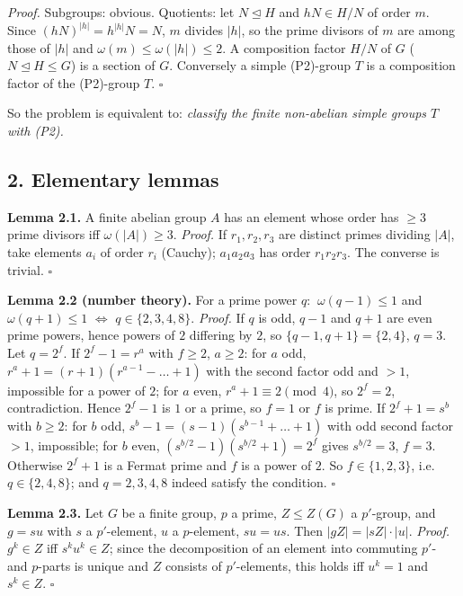 \documentclass[11pt,a4paper]{article}
\begin{document}
\emph{Proof.} Subgroups: obvious. Quotients: let \(N\trianglelefteq H\)
and \(hN\in H/N\) of order \(m\). Since \((hN)^{|h|}=h^{|h|}N=N\), \(m\)
divides \(|h|\), so the prime divisors of \(m\) are among those of
\(|h|\) and \(\omega(m)\le\omega(|h|)\le 2\). A composition factor
\(H/N\) of \(G\) (\(N\trianglelefteq H\le G\)) is a section of \(G\).
Conversely a simple (P2)-group \(T\) is a composition factor of the
(P2)-group \(T\). \(\square\)

So the problem is equivalent to: \emph{classify the finite non-abelian
simple groups \(T\) with (P2).}

\subsection{2. Elementary lemmas}\label{elementary-lemmas}

\textbf{Lemma 2.1.} A finite abelian group \(A\) has an element whose
order has \(\ge 3\) prime divisors iff \(\omega(|A|)\ge 3\).
\emph{Proof.} If \(r_1,r_2,r_3\) are distinct primes dividing \(|A|\),
take elements \(a_i\) of order \(r_i\) (Cauchy); \(a_1a_2a_3\) has order
\(r_1r_2r_3\). The converse is trivial. \(\square\)

\textbf{Lemma 2.2 (number theory).} For a prime power \(q\):
\(\ \omega(q-1)\le 1\) and \(\omega(q+1)\le 1\) \(\iff\)
\(q\in\{2,3,4,8\}\). \emph{Proof.} If \(q\) is odd, \(q-1\) and \(q+1\)
are even prime powers, hence powers of \(2\) differing by \(2\), so
\(\{q-1,q+1\}=\{2,4\}\), \(q=3\). Let \(q=2^f\). If \(2^f-1=r^a\) with
\(f\ge 2\), \(a\ge 2\): for \(a\) odd, \(r^a+1=(r+1)(r^{a-1}-\dots+1)\)
with the second factor odd and \(>1\), impossible for a power of \(2\);
for \(a\) even, \(r^a+1\equiv 2\pmod 4\), so \(2^f=2\), contradiction.
Hence \(2^f-1\) is \(1\) or a prime, so \(f=1\) or \(f\) is prime. If
\(2^f+1=s^b\) with \(b\ge 2\): for \(b\) odd,
\(s^b-1=(s-1)(s^{b-1}+\dots+1)\) with odd second factor \(>1\),
impossible; for \(b\) even, \((s^{b/2}-1)(s^{b/2}+1)=2^f\) gives
\(s^{b/2}=3\), \(f=3\). Otherwise \(2^f+1\) is a Fermat prime and \(f\)
is a power of \(2\). So \(f\in\{1,2,3\}\), i.e.~\(q\in\{2,4,8\}\); and
\(q=2,3,4,8\) indeed satisfy the condition. \(\square\)

\textbf{Lemma 2.3.} Let \(G\) be a finite group, \(p\) a prime,
\(Z\le Z(G)\) a \(p'\)-group, and \(g=su\) with \(s\) a \(p'\)-element,
\(u\) a \(p\)-element, \(su=us\). Then \(|gZ|=|sZ|\cdot|u|\).
\emph{Proof.} \(g^k\in Z\) iff \(s^ku^k\in Z\); since the decomposition
of an element into commuting \(p'\)- and \(p\)-parts is unique and \(Z\)
consists of \(p'\)-elements, this holds iff \(u^k=1\) and \(s^k\in Z\).
\(\square\)
\end{document}
